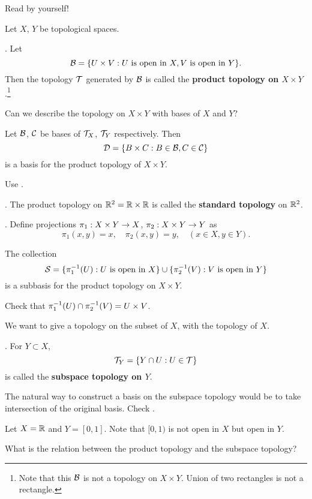 Read by yourself!

\pagebreak


Let \(X\), \(Y\) be topological spaces.

.  Let
\[
    \mathcal{B} = \{U \times V: U \text{ is open in } X, V \text{ is open in } Y\}.
\]
Then the topology \(\mathcal{T}\) generated by \(\mathcal{B}\) is called the \textbf{product topology on \(X \times Y\)}.\footnote{Note that this \(\mathcal{B}\) is not a topology on \(X \times Y\). Union of two rectangles is not a rectangle.}

Can we describe the topology on \(X \times Y\) with bases of \(X\) and \(Y\)?

 Let \(\mathcal{B}\), \(\mathcal{C}\) be bases of \(\mathcal{T}_X\), \(\mathcal{T}_Y\) respectively. Then
\[
    \mathcal{D} = \{B\times C : B\in \mathcal{B}, C \in \mathcal{C}\}
\]
is a basis for the product topology of \(X \times Y\).

\pf Use .

\ex. The product topology on \(\mathbb{R}^2 = \mathbb{R} \times \mathbb{R}\) is called the \textbf{standard topology} on \(\mathbb{R}^2\).

. Define projections \(\pi_1 : X\times Y \rightarrow X\), \(\pi_2 : X\times Y \rightarrow Y\) as
\[
    \pi_1(x, y) = x, \quad \pi_2(x, y) = y, \quad (x \in X, y\in Y).
\]

 The collection
\[
    \mathcal{S} = \{\pi_1^{-1}(U): U \text{ is open in } X\} \cup \{\pi_2^{-1}(V) : V \text { is open in } Y\}
\]
is a subbasis for the product topology on \(X\times Y\).

\pf Check that \(\pi_1^{-1}(U) \cap \pi_2^{-1}(V) = U \times V\).

\pagebreak


We want to give a topology on the subset of \(X\), with the topology of \(X\).

. For \(Y \subset X\),
\[
    \mathcal{T}_Y = \{Y \cap U : U \in \mathcal{T}\}
\]
is called the \textbf{subspace topology on \(Y\)}.

The natural way to construct a basis on the subspace topology would be to take intersection of the original basis. Check .

\rmk Let \(X = \mathbb{R}\) and \(Y = [0, 1]\). Note that \([0, 1)\) is not open in \(X\) but open in \(Y\).

What is the relation between the product topology and the subspace topology?

